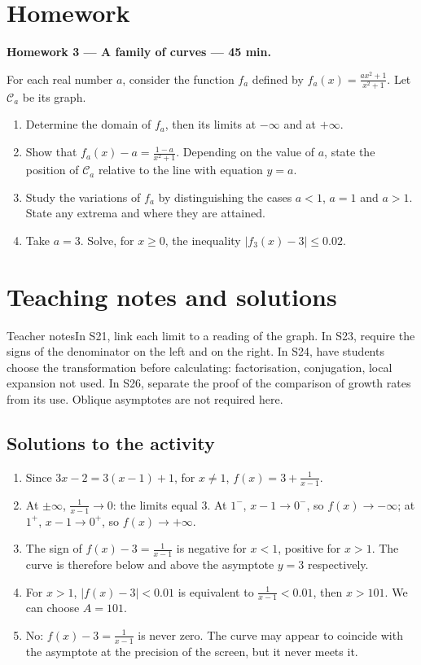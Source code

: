 \section{Homework}\textbf{Homework 3 --- A family of curves --- 45 min.}\par For each real number $a$, consider the function $f_a$ defined by $f_a(x)=\frac{ax^2+1}{x^2+1}$. Let $\mathcal C_a$ be its graph.
\begin{enumerate}\item Determine the domain of $f_a$, then its limits at $-\infty$ and at $+\infty$.
\item Show that $f_a(x)-a=\frac{1-a}{x^2+1}$. Depending on the value of $a$, state the position of $\mathcal C_a$ relative to the line with equation $y=a$.
\item Study the variations of $f_a$ by distinguishing the cases $a<1$, $a=1$ and $a>1$. State any extrema and where they are attained.
\item Take $a=3$. Solve, for $x\ge0$, the inequality $|f_3(x)-3|\le0.02$.\end{enumerate}

\ifprof\clearpage\section{Teaching notes and solutions}\begin{profbox}{Teacher notes}In S21, link each limit to a reading of the graph. In S23, require the signs of the denominator on the left and on the right. In S24, have students choose the transformation before calculating: factorisation, conjugation, local expansion not used. In S26, separate the proof of the comparison of growth rates from its use. Oblique asymptotes are not required here.\end{profbox}

\subsection{Solutions to the activity}\begin{enumerate}
\item Since $3x-2=3(x-1)+1$, for $x\ne1$, $f(x)=3+\frac{1}{x-1}$.
\item At $\pm\infty$, $\frac{1}{x-1}\to0$: the limits equal $3$. At $1^-$, $x-1\to0^-$, so $f(x)\to-\infty$; at $1^+$, $x-1\to0^+$, so $f(x)\to+\infty$.
\item The sign of $f(x)-3=\frac{1}{x-1}$ is negative for $x<1$, positive for $x>1$. The curve is therefore below and above the asymptote $y=3$ respectively.
\item For $x>1$, $|f(x)-3|<0.01$ is equivalent to $\frac{1}{x-1}<0.01$, then $x>101$. We can choose $A=101$.
\item No: $f(x)-3=\frac{1}{x-1}$ is never zero. The curve may appear to coincide with the asymptote at the precision of the screen, but it never meets it.
\end{enumerate}

